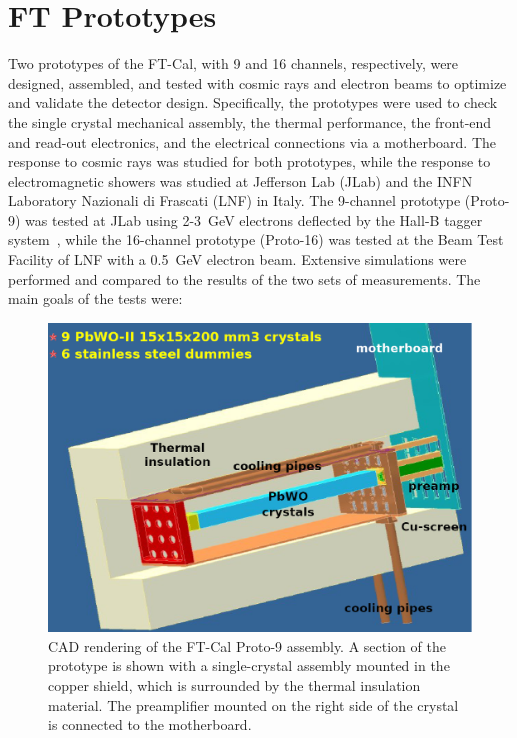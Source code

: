 \section{FT Prototypes}

Two prototypes of the FT-Cal, with 9 and 16 channels, respectively, were designed, assembled, and tested with
cosmic rays and electron beams to optimize and validate the detector design. Specifically, the prototypes were
used to check the single crystal mechanical assembly, the thermal performance, the front-end and read-out
electronics, and the electrical connections via a motherboard. The response to cosmic rays was studied for both
prototypes, while the response to electromagnetic showers was studied at Jefferson Lab (JLab) and the INFN
Laboratory Nazionali di Frascati (LNF) in Italy. The 9-channel prototype (Proto-9) was tested at JLab using 2-3~GeV
electrons deflected by the Hall-B tagger system~\cite{tagger},  while the 16-channel prototype (Proto-16) was
tested at the Beam Test Facility of LNF with a 0.5~GeV electron beam. Extensive simulations were performed
and compared to the results of the two sets of measurements. The main goals of the tests were:

\begin{figure}
\includegraphics[width=1.0\columnwidth]{./fig/p9-whole.eps}
\caption{CAD rendering of the FT-Cal Proto-9 assembly. A section of the prototype is shown with a single-crystal
  assembly mounted in the copper shield, which is surrounded by the thermal insulation material. The preamplifier
  mounted on the right side of the crystal is connected to the motherboard.}
\label{fig:p9-whole}
\end{figure}

